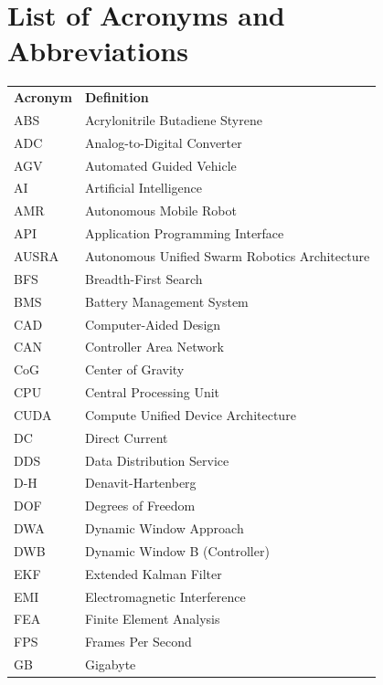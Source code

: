 
\chapter*{List of Acronyms and Abbreviations}

\begin{longtable}{@{}p{3.5cm} p{10cm}@{}}

\textbf{Acronym} & \textbf{Definition} \\[0.3cm]

ABS & Acrylonitrile Butadiene Styrene \\
ADC & Analog-to-Digital Converter \\
AGV & Automated Guided Vehicle \\
AI & Artificial Intelligence \\
AMR & Autonomous Mobile Robot \\
API & Application Programming Interface \\
AUSRA & Autonomous Unified Swarm Robotics Architecture \\
BFS & Breadth-First Search \\
BMS & Battery Management System \\
CAD & Computer-Aided Design \\
CAN & Controller Area Network \\
CoG & Center of Gravity \\
CPU & Central Processing Unit \\
CUDA & Compute Unified Device Architecture \\
DC & Direct Current \\
DDS & Data Distribution Service \\
D-H & Denavit-Hartenberg \\
DOF & Degrees of Freedom \\
DWA & Dynamic Window Approach \\
DWB & Dynamic Window B (Controller) \\
EKF & Extended Kalman Filter \\
EMI & Electromagnetic Interference \\
FEA & Finite Element Analysis \\
FPS & Frames Per Second \\
GB & Gigabyte \\

\end{longtable}
